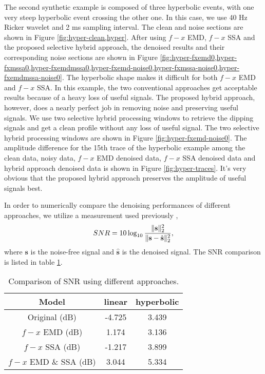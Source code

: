 The second synthetic example is composed of three hyperbolic events, with one very steep hyperbolic event crossing the other one. In this case, we use 40 Hz Ricker wavelet and 2 ms sampling interval. The clean and noise sections are shown in Figure \ref{fig:hyper-clean,hyper}. After using $f-x$ EMD, $f-x$ SSA and the proposed selective hybrid approach, the denoised results and their corresponding noise sections are shown in Figure \ref{fig:hyper-fxemd0,hyper-fxmssa0,hyper-fxemdmssa0,hyper-fxemd-noise0,hyper-fxmssa-noise0,hyper-fxemdmssa-noise0}. The hyperbolic shape makes it difficult for both $f-x$ EMD and $f-x$ SSA. In this example, the two conventional approaches  get acceptable results because of a heavy loss of useful signals. The proposed hybrid approach, however, does a nearly perfect job in removing noise and preserving useful signals. We use two selective hybrid processing windows to retrieve the dipping signals and get a clean profile without any loss of useful signal. The two selective hybrid processing windows are shown in Figure \ref{fig:hyper-fxemd-noise0}. The amplitude difference for the 15th trace of the hyperbolic example among the clean data, noisy data, $f-x$ EMD denoised data, $f-x$ SSA denoised data and hybrid approach denoised data is shown in Figure \ref{fig:hyper-traces}. It's very obvious that the proposed hybrid approach preserves the amplitude of useful signals best.



In order to numerically compare the denoising performances of different approaches,  we utilize a measurement used previously \cite[]{hennenfent2006},
\begin{equation}
\label{eq:diff}
SNR=10\log_{10}\frac{\Arrowvert \mathbf{s} \Arrowvert_2^2}{\Arrowvert \mathbf{s}-\hat{\mathbf{s}}\Arrowvert_2^2},
\end{equation}
where $\mathbf{s}$ is the noise-free signal and $\hat{\mathbf{s}}$ is the denoised signal.
The SNR comparison is listed in table \ref{tbl:snrcomp}.

\begin{table}
\caption{Comparison of SNR using different approaches.}
\centering
     \begin{tabular}{|c|c|c|} 
	  \hline Model & linear  &  hyperbolic 			       		 \\ 
	  \hline Original (dB) & -4.725 & 3.439 \\
      \hline $f-x$ EMD (dB) & 	1.174 & 3.136		       		 \\ 
      \hline $f-x$ SSA (dB) & -1.217  & 3.899  		\\
      \hline $f-x$ EMD  \& SSA (dB)  & 3.044  & 5.334  \\
      \hline
    \end{tabular} 
\label{tbl:snrcomp}
\end{table}


